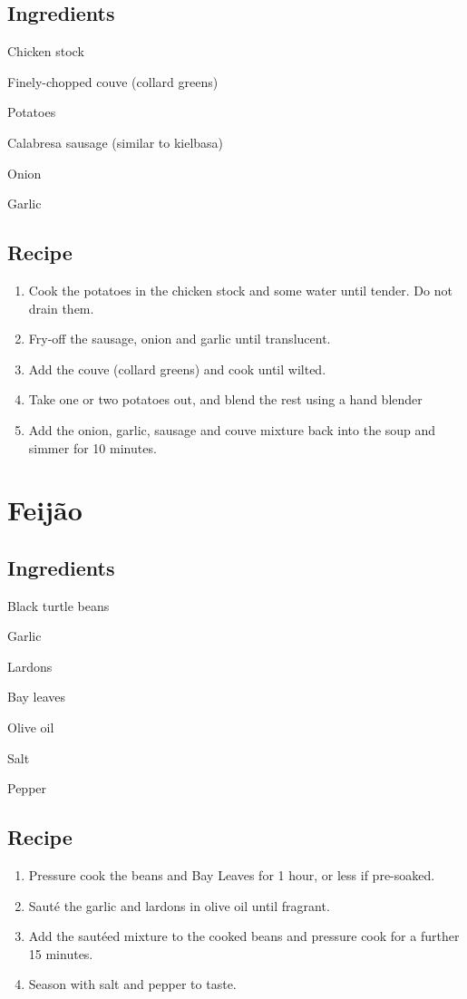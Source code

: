 \subsection*{Ingredients}
\begin{ingredients}
    \item Chicken stock
    \item Finely-chopped couve (collard greens)
    \item Potatoes
    \item Calabresa sausage (similar to kielbasa)
    \item Onion
    \item Garlic
\end{ingredients}
\subsection*{Recipe}
\begin{enumerate}
    \item Cook the potatoes in the chicken stock and some water until tender. Do not drain them.
    \item Fry-off the sausage, onion and garlic until translucent.
    \item Add the couve (collard greens) and cook until wilted.
    \item Take one or two potatoes out, and blend the rest using a hand blender
    \item Add the onion, garlic, sausage and couve mixture back into the soup and simmer for 10 minutes.
\end{enumerate}

\newpage
\section{Feijão}
\subsection*{Ingredients}
\begin{ingredients}
    \item Black turtle beans
    \item Garlic
    \item Lardons
    \item Bay leaves
    \item Olive oil
    \item Salt
    \item Pepper
\end{ingredients}
\subsection*{Recipe}
\begin{enumerate}
    \item Pressure cook the beans and Bay Leaves for 1 hour, or less if pre-soaked.
    \item Sauté the garlic and lardons in olive oil until fragrant.
    \item Add the sautéed mixture to the cooked beans and pressure cook for a further 15 minutes.
    \item Season with salt and pepper to taste.
\end{enumerate}

